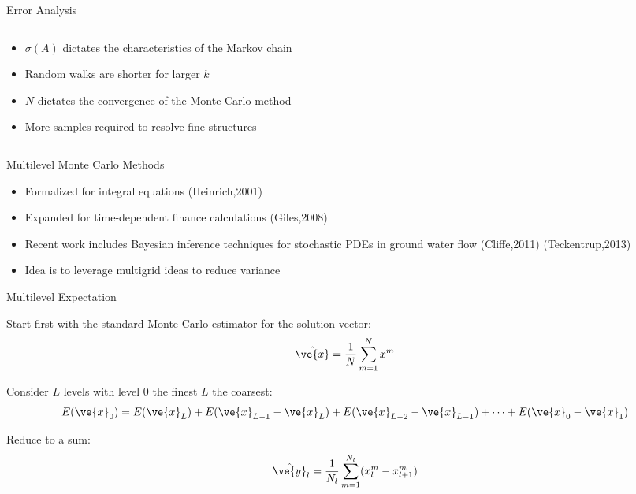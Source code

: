 \documentclass{beamer}
\begin{document}
\begin{frame}{Error Analysis}
\begin{columns}
\begin{column}{0.7\textwidth}
      \vspace{-0.25in}

      \begin{itemize}
      \item $\sigma(A)$ dictates the characteristics of the Markov
        chain
        \smallskip
      \item Random walks are shorter for larger $k$
        \smallskip
      \item $N$ dictates the convergence of the Monte Carlo method
        \smallskip
      \item More samples required to resolve fine structures
      \end{itemize}

    \end{column}

  \end{columns}

\end{frame}

\begin{frame}{Multilevel Monte Carlo Methods}

  \begin{itemize}
  \item Formalized for integral equations (Heinrich,2001)
    \medskip
  \item Expanded for time-dependent finance calculations (Giles,2008)
    \medskip
  \item Recent work includes Bayesian inference techniques for
    stochastic PDEs in ground water flow (Cliffe,2011)
    (Teckentrup,2013)
    \medskip
  \item Idea is to leverage multigrid ideas to reduce variance
  \end{itemize}

\end{frame}

\begin{frame}{Multilevel Expectation}

  Start first with the standard Monte Carlo estimator for the
  solution vector:
  \[
  \hat{\ve{x}} = \frac{1}{N} \sum_{m=1}^N x^m
  \]

  \medskip

  Consider $L$ levels with level 0 the finest $L$ the coarsest:
  \[
  E(\ve{x}_{0}) = E(\ve{x}_{L}) + E(\ve{x}_{L-1} - \ve{x}_{L}) +
  E(\ve{x}_{L-2} - \ve{x}_{L-1}) + \dots + E(\ve{x}_{0} - \ve{x}_{1})
  \]

  \medskip

  Reduce to a sum:
  \[
  \hat{\ve{y}}_{l} = \frac{1}{N_l} \sum_{m=1}^{N_l} (x^m_{l} -
  x^m_{l+1})
  \]

\end{frame}
\end{document}
